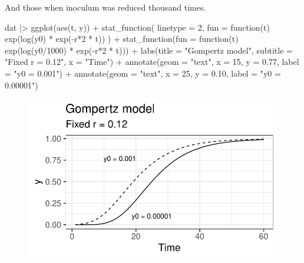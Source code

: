 \documentclass[
  letterpaper,
  DIV=11,
  numbers=noendperiod]{scrreprt}
\newenvironment{Shaded}{\begin{snugshade}}{\end{snugshade}}
\newcommand{\AttributeTok}[1]{\textcolor[rgb]{0.40,0.45,0.13}{#1}}
\newcommand{\ControlFlowTok}[1]{\textcolor[rgb]{0.00,0.23,0.31}{#1}}
\newcommand{\DecValTok}[1]{\textcolor[rgb]{0.68,0.00,0.00}{#1}}
\newcommand{\FloatTok}[1]{\textcolor[rgb]{0.68,0.00,0.00}{#1}}
\newcommand{\FunctionTok}[1]{\textcolor[rgb]{0.28,0.35,0.67}{#1}}
\newcommand{\NormalTok}[1]{\textcolor[rgb]{0.00,0.23,0.31}{#1}}
\newcommand{\SpecialCharTok}[1]{\textcolor[rgb]{0.37,0.37,0.37}{#1}}
\newcommand{\StringTok}[1]{\textcolor[rgb]{0.13,0.47,0.30}{#1}}
\begin{document}
And those when inoculum was reduced thousand times.

\begin{Shaded}
\begin{Highlighting}[]
\NormalTok{dat }\SpecialCharTok{|\textgreater{}}
  \FunctionTok{ggplot}\NormalTok{(}\FunctionTok{aes}\NormalTok{(t, y)) }\SpecialCharTok{+}
  \FunctionTok{stat\_function}\NormalTok{(}
    \AttributeTok{linetype =} \DecValTok{2}\NormalTok{,}
    \AttributeTok{fun =} \ControlFlowTok{function}\NormalTok{(t) }\FunctionTok{exp}\NormalTok{(}\FunctionTok{log}\NormalTok{(y0) }\SpecialCharTok{*} \FunctionTok{exp}\NormalTok{(}\SpecialCharTok{{-}}\NormalTok{r}\SpecialCharTok{*}\DecValTok{2} \SpecialCharTok{*}\NormalTok{ t))}
\NormalTok{  ) }\SpecialCharTok{+}
  \FunctionTok{stat\_function}\NormalTok{(}\AttributeTok{fun =} \ControlFlowTok{function}\NormalTok{(t) }\FunctionTok{exp}\NormalTok{(}\FunctionTok{log}\NormalTok{(y0}\SpecialCharTok{/}\DecValTok{1000}\NormalTok{) }\SpecialCharTok{*} \FunctionTok{exp}\NormalTok{(}\SpecialCharTok{{-}}\NormalTok{r}\SpecialCharTok{*}\DecValTok{2} \SpecialCharTok{*}\NormalTok{ t))) }\SpecialCharTok{+}
  \FunctionTok{labs}\NormalTok{(}\AttributeTok{title =} \StringTok{"Gompertz model"}\NormalTok{, }\AttributeTok{subtitle =} \StringTok{"Fixed r = 0.12"}\NormalTok{, }\AttributeTok{x =} \StringTok{"Time"}\NormalTok{) }\SpecialCharTok{+}
  \FunctionTok{annotate}\NormalTok{(}\AttributeTok{geom =} \StringTok{"text"}\NormalTok{, }\AttributeTok{x =} \DecValTok{15}\NormalTok{, }\AttributeTok{y =} \FloatTok{0.77}\NormalTok{, }\AttributeTok{label =} \StringTok{"y0 = 0.001"}\NormalTok{) }\SpecialCharTok{+}
  \FunctionTok{annotate}\NormalTok{(}\AttributeTok{geom =} \StringTok{"text"}\NormalTok{, }\AttributeTok{x =} \DecValTok{25}\NormalTok{, }\AttributeTok{y =} \FloatTok{0.10}\NormalTok{, }\AttributeTok{label =} \StringTok{"y0 = 0.00001"}\NormalTok{)}
\end{Highlighting}
\end{Shaded}

\begin{figure}[H]

{\centering \includegraphics{./temporal-models_files/figure-pdf/unnamed-chunk-20-1.pdf}

}

\end{figure}
\end{document}
